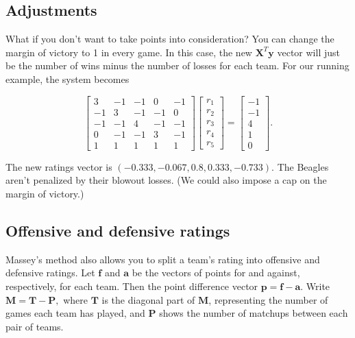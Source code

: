 \documentclass[
]{book}
\theoremstyle{definition}
\theoremstyle{definition}
\theoremstyle{definition}
\theoremstyle{definition}
\theoremstyle{remark}
\begin{document}
\subsection*{Adjustments}\label{adjustments}

What if you don't want to take points into consideration? You can change the margin of victory to 1 in every game. In this case, the new \(\mathbf{X}^T\mathbf{y}\) vector will just be the number of wins minus the number of losses for each team. For our running example, the system becomes

\[\left[\begin{array}{rrrrr}3 & -1 & -1 & 0 & -1\\-1 & 3 & -1 & -1 & 0\\-1 & -1 & 4 & -1 & -1\\0 & -1 & -1 & 3 & -1\\1 & 1 & 1 & 1 & 1\end{array}\right]\begin{bmatrix}r_1\\r_2\\r_3\\r_4\\r_5\end{bmatrix}=\left[\begin{array}{r}-1\\-1\\4\\1\\0\end{array}\right].\]

The new ratings vector is \((-0.333,-0.067,0.8,0.333,-0.733)\). The Beagles aren't penalized by their blowout losses. (We could also impose a cap on the margin of victory.)

\subsection*{Offensive and defensive ratings}\label{offensive-and-defensive-ratings}

Massey's method also allows you to split a team's rating into offensive and defensive ratings. Let \(\mathbf{f}\) and \(\mathbf{a}\) be the vectors of points for and against, respectively, for each team. Then the point difference vector \(\mathbf{p}=\mathbf{f}-\mathbf{a}\). Write \(\mathbf{M}=\mathbf{T}-\mathbf{P},\) where \(\mathbf{T}\) is the diagonal part of \(\mathbf{M}\), representing the number of games each team has played, and \(\mathbf{P}\) shows the number of matchups between each pair of teams.
\end{document}
